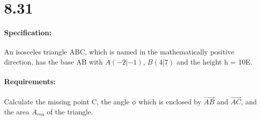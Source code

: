 \section{8.31}
\paragraph{Specification:}
An isosceles triangle ABC, which is named in the mathematically positive direction, has the 
base AB with $A(-2|-1)$, $B(4|7)$ and the height h = 10E. 

\paragraph{Requirements:}
Calculate the missing point C, the angle $\phi$ which is enclosed by $\vec{AB}$ and $\vec{AC}$, 
and the area $A_{rea}$ of the triangle.

\def\height{10}

\def\A{\begin{pmatrix}
    -2 \\ 
    -1
\end{pmatrix}}

\def\B{\begin{pmatrix}
    4 \\ 
    7
\end{pmatrix}}

\def\AB{\begin{pmatrix}
    6 \\ 
    8
\end{pmatrix}}

\def\vAC{\begin{pmatrix}
    -5 \\ 
    10
\end{pmatrix}}

\def\ABhalf{\begin{pmatrix}
    3 \\ 
    4
\end{pmatrix}}

\def\ABmid{\begin{pmatrix}
    1 \\ 
    3
\end{pmatrix}}

\def\ABnorm{\begin{pmatrix}
    -8 \\ 
    6
\end{pmatrix}}

\def\ABnrommag{\sqrt{(-8)^2 + 6^2}}

\def\ABmidzero{\begin{pmatrix}
    -0.8 \\ 
    0.6
\end{pmatrix}}

